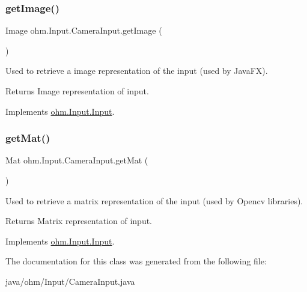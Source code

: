 \subsubsection{\texorpdfstring{get\+Image()}{getImage()}}
{\footnotesize\ttfamily Image ohm.\+Input.\+Camera\+Input.\+get\+Image (\begin{DoxyParamCaption}{ }\end{DoxyParamCaption})}

Used to retrieve a image representation of the input (used by Java\+FX). \begin{DoxyReturn}{Returns}
Image representation of input. 
\end{DoxyReturn}


Implements \hyperlink{interfaceohm_1_1_input_1_1_input_aa58ab6e0dd8e835ac9b819402d150d17}{ohm.\+Input.\+Input}.

\hypertarget{classohm_1_1_input_1_1_camera_input_a9717b65589c2edfeac13f0c4a3e85b4d}{}\label{classohm_1_1_input_1_1_camera_input_a9717b65589c2edfeac13f0c4a3e85b4d} 
\subsubsection{\texorpdfstring{get\+Mat()}{getMat()}}
{\footnotesize\ttfamily Mat ohm.\+Input.\+Camera\+Input.\+get\+Mat (\begin{DoxyParamCaption}{ }\end{DoxyParamCaption})}

Used to retrieve a matrix representation of the input (used by Opencv libraries). \begin{DoxyReturn}{Returns}
Matrix representation of input. 
\end{DoxyReturn}


Implements \hyperlink{interfaceohm_1_1_input_1_1_input_a9e65aa172b8ea1add3c2f09df554f198}{ohm.\+Input.\+Input}.



The documentation for this class was generated from the following file\+:\begin{DoxyCompactItemize}
\item 
java/ohm/\+Input/Camera\+Input.\+java\end{DoxyCompactItemize}
